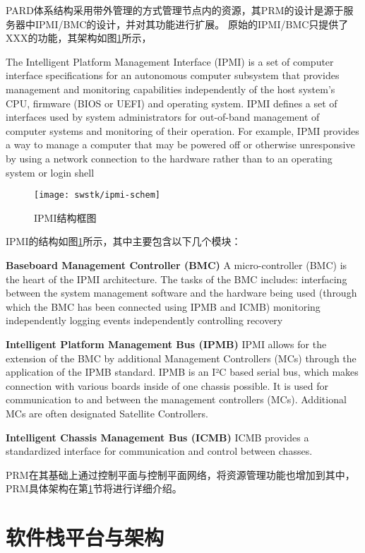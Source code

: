PARD体系结构采用带外管理的方式管理节点内的资源，其PRM的设计是源于服务器中IPMI/BMC的设计，并对其功能进行扩展。
原始的IPMI/BMC只提供了XXX的功能，其架构如图\ref{fig:ipmi-schem}所示，

The Intelligent Platform Management Interface (IPMI) is a set of computer interface specifications for an autonomous computer subsystem that provides management and monitoring capabilities independently of the host system's CPU, firmware (BIOS or UEFI) and operating system. IPMI defines a set of interfaces used by system administrators for out-of-band management of computer systems and monitoring of their operation. For example, IPMI provides a way to manage a computer that may be powered off or otherwise unresponsive by using a network connection to the hardware rather than to an operating system or login shell

\begin{figure}[tbh]
  \centering
  \texttt{[image: swstk/ipmi-schem]}
  \caption{IPMI结构框图}
  \label{fig:ipmi-schem}
\end{figure}

IPMI的结构如图\ref{fig:ipmi-schem}所示，其中主要包含以下几个模块：

\textbf{Baseboard Management Controller (BMC)}\quad
A micro-controller (BMC) is the heart of the IPMI architecture. The tasks of the BMC includes:
interfacing between the system management software and the hardware being used (through which the BMC has been connected using IPMB and ICMB)
monitoring independently
logging events independently
controlling recovery

\textbf{Intelligent Platform Management Bus (IPMB)}\quad
IPMI allows for the extension of the BMC by additional Management Controllers (MCs) through the application of the IPMB standard.
IPMB is an I²C based serial bus, which makes connection with various boards inside of one chassis possible. It is used for communication to and between the management controllers (MCs). Additional MCs are often designated Satellite Controllers.

\textbf{Intelligent Chassis Management Bus (ICMB)}\quad
ICMB provides a standardized interface for communication and control between chasses.

PRM在其基础上通过控制平面与控制平面网络，将资源管理功能也增加到其中，PRM具体架构在第\ref{chap:prm:arch}节将进行详细介绍。


\section{软件栈平台与架构}
\label{chap:prm:arch}


